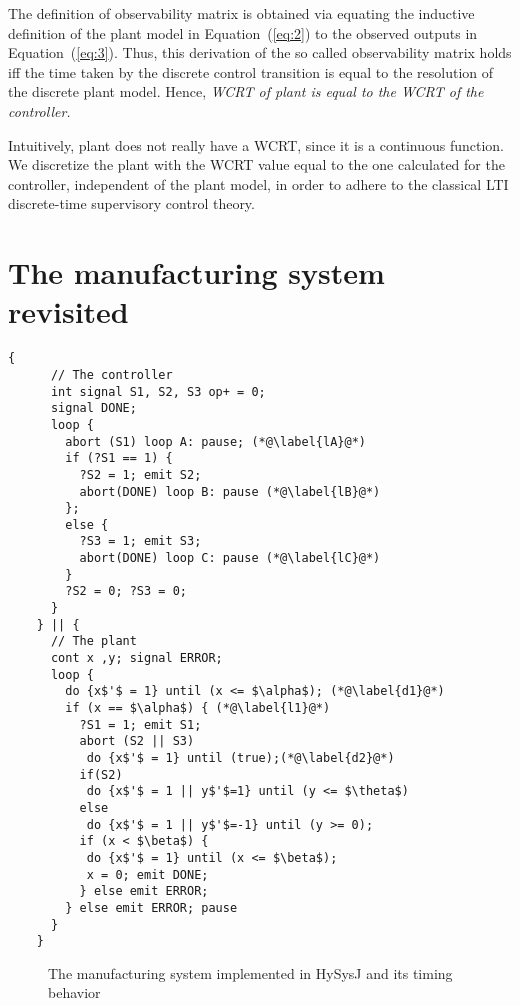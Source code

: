 \documentclass[10pt,journal,cspaper,compsoc]{IEEEtran}
\begin{document}
The definition of observability matrix is obtained via equating the
inductive definition of the plant model in Equation~(\ref{eq:2}) to the
observed outputs in Equation~(\ref{eq:3}).  Thus, this derivation of the
so called observability matrix holds \textrm{iff} the time taken by the
discrete control transition is equal to the resolution of the discrete
plant model. Hence, \textit{WCRT of plant is equal to the WCRT of the
  controller.}

Intuitively, plant does not really have a WCRT, since it is a continuous
function. We discretize the plant with the WCRT value equal to the one
calculated for the controller, independent of the plant model, in order
to adhere to the classical LTI discrete-time supervisory control theory.

\section{The manufacturing system revisited}
\label{sec:manuf-syst-revis}

\newbox{\fman}
\begin{lrbox}{\fman}
  \begin{lstlisting}[mathescape,style=sysj,morekeywords={until,cont,signal,loop,abort,await,emit,present,trap,pause,exit,delay,suspend}]
    {
      // The controller
      int signal S1, S2, S3 op+ = 0;
      signal DONE;
      loop {
        abort (S1) loop A: pause; (*@\label{lA}@*)
        if (?S1 == 1) { 
          ?S2 = 1; emit S2; 
          abort(DONE) loop B: pause (*@\label{lB}@*)
        };
        else {
          ?S3 = 1; emit S3; 
          abort(DONE) loop C: pause (*@\label{lC}@*)
        }
        ?S2 = 0; ?S3 = 0;
      }
    } || {
      // The plant
      cont x ,y; signal ERROR;
      loop {
        do {x$'$ = 1} until (x <= $\alpha$); (*@\label{d1}@*)
        if (x == $\alpha$) { (*@\label{l1}@*) 
          ?S1 = 1; emit S1;
          abort (S2 || S3) 
           do {x$'$ = 1} until (true);(*@\label{d2}@*)
          if(S2) 
           do {x$'$ = 1 || y$'$=1} until (y <= $\theta$)
          else 
           do {x$'$ = 1 || y$'$=-1} until (y >= 0);
          if (x < $\beta$) {
           do {x$'$ = 1} until (x <= $\beta$);
           x = 0; emit DONE;
          } else emit ERROR;
        } else emit ERROR; pause
      }
    }
  \end{lstlisting}

\end{lrbox}
\begin{figure}[t!]
  
  \caption{The manufacturing system implemented in HySysJ and its timing
    behavior}
  \label{fig:19}
\end{figure}
\end{document}
